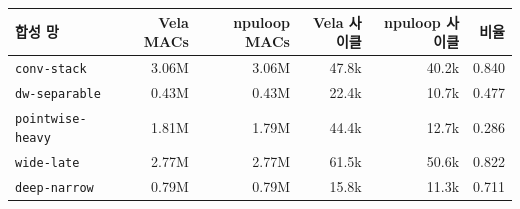 \setlength{\tabcolsep}{5pt}
\begin{tabular}{lrrrrr}
\toprule
합성 망 & Vela MACs & npuloop MACs & Vela 사이클 & npuloop 사이클 & 비율 \\
\midrule
\texttt{conv-stack} & 3.06M & 3.06M & 47.8k & 40.2k & 0.840 \\
\texttt{dw-separable} & 0.43M & 0.43M & 22.4k & 10.7k & 0.477 \\
\texttt{pointwise-heavy} & 1.81M & 1.79M & 44.4k & 12.7k & 0.286 \\
\texttt{wide-late} & 2.77M & 2.77M & 61.5k & 50.6k & 0.822 \\
\texttt{deep-narrow} & 0.79M & 0.79M & 15.8k & 11.3k & 0.711 \\
\bottomrule
\end{tabular}
